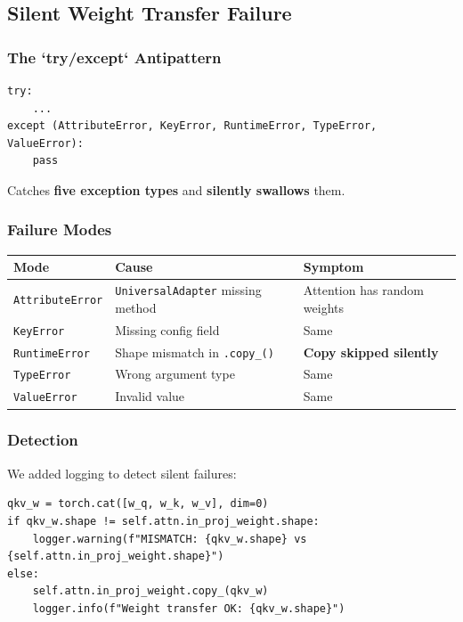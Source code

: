 \subsection{Silent Weight Transfer Failure}

\subsubsection{The `try/except` Antipattern}

\begin{lstlisting}
try:
    ...
except (AttributeError, KeyError, RuntimeError, TypeError, ValueError):
    pass
\end{lstlisting}

Catches \textbf{five exception types} and \textbf{silently swallows} them.

\subsubsection{Failure Modes}

\begin{table}[H]
\centering
\small
\begin{tabular}{lll}
\toprule
\textbf{Mode} & \textbf{Cause} & \textbf{Symptom} \\
\midrule
\texttt{AttributeError} & \texttt{UniversalAdapter} missing method & Attention has random weights \\
\texttt{KeyError} & Missing config field & Same \\
\texttt{RuntimeError} & Shape mismatch in \texttt{.copy\_()} & \textbf{Copy skipped silently} \\
\texttt{TypeError} & Wrong argument type & Same \\
\texttt{ValueError} & Invalid value & Same \\
\bottomrule
\end{tabular}
\end{table}

\subsubsection{Detection}

We added logging to detect silent failures:

\begin{lstlisting}
qkv_w = torch.cat([w_q, w_k, w_v], dim=0)
if qkv_w.shape != self.attn.in_proj_weight.shape:
    logger.warning(f"MISMATCH: {qkv_w.shape} vs {self.attn.in_proj_weight.shape}")
else:
    self.attn.in_proj_weight.copy_(qkv_w)
    logger.info(f"Weight transfer OK: {qkv_w.shape}")
\end{lstlisting}

